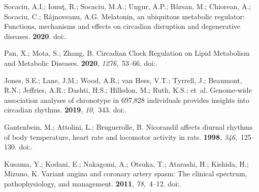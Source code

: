 \documentclass[genes,article,accept,moreauthors,pdftex]{Definitions/mdpi}
\begin{document}
\begin{thebibliography}{999}
Socaciu, A.I.; Ionuţ, R.; Socaciu, M.A.; Ungur, A.P.; Bârsan, M.; Chiorean,
  A.; Socaciu, C.; Râjnoveanu, A.G.
\newblock Melatonin, an ubiquitous metabolic regulator: Functions, mechanisms
  and effects on circadian disruption and degenerative diseases.
 {\bf 2020}.
\newblock
  doi:{\href{https://doi.org/10.1007/s11154-020-09570-9}{}}.

Pan, X.; Mota, S.; Zhang, B.
\newblock Circadian {Clock} {Regulation} on {Lipid} {Metabolism} and
  {Metabolic} {Diseases}.
 {\bf 2020}, {\em
  1276},~53--66.
\newblock
  doi:{\href{https://doi.org/10.1007/978-981-15-6082-8_5}{}}.

Jones, S.E.; Lane, J.M.; Wood, A.R.; van Hees, V.T.; Tyrrell, J.; Beaumont,
  R.N.; Jeffries, A.R.; Dashti, H.S.; Hillsdon, M.; Ruth, K.S.; et~al.
\newblock Genome-wide association analyses of chronotype in 697,828 individuals
  provides insights into circadian rhythms.
 {\bf 2019}, {\em 10},~343.
\newblock 
  doi:{\href{https://doi.org/10.1038/s41467-018-08259-7}{}}.

Gantenbein, M.; Attolini, L.; Bruguerolle, B.
\newblock Nicorandil affects diurnal rhythms of body temperature, heart rate
  and locomotor activity in rats.
 {\bf 1998}, {\em
  346},~125--130.
\newblock
  doi:{\href{https://doi.org/10.1016/s0014-2999(97)01606-3}{}}.

Kusama, Y.; Kodani, E.; Nakagomi, A.; Otsuka, T.; Atarashi, H.; Kishida, H.;
  Mizuno, K.
\newblock Variant angina and coronary artery spasm: The clinical spectrum,
  pathophysiology, and management.
  {\bf 2011}, {\em 78},~4--12.
\newblock
  doi:{\href{https://doi.org/10.1272/jnms.78.4}{}}.


\end{thebibliography}
\end{document}
